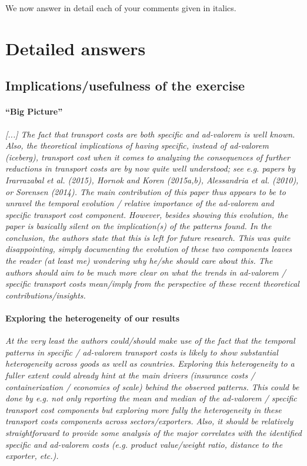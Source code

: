 \documentclass[a4paper,11pt]{article}
\begin{document}
We now answer in detail each of your comments given in italics.

\section{Detailed answers \label{sec:detailed_answers}}

\subsection{Implications/usefulness of the exercise}

\paragraph{``Big Picture''} \textit{[...] The fact that transport costs are both specific and ad-valorem is well known. Also, the theoretical implications of having specific, instead of ad-valorem (iceberg), transport cost when it comes to analyzing the consequences of further reductions in transport costs are by now quite well understood; see e.g. papers by Irarrazabal et al. (2015), Hornok and Koren (2015a,b), Alessandria et al. (2010), or Sorensen (2014). The main contribution of this paper thus appears to be to unravel the temporal evolution / relative importance of the ad-valorem and specific transport cost component. However, besides showing this evolution, the paper is basically silent on the implication(s) of the patterns found. In the conclusion, the authors state that this is left for future research. This was quite disappointing, simply documenting the evolution of these two components leaves the reader (at least me) wondering why he/she should care about this. The authors should aim to be much more clear on what the trends in ad-valorem / specific transport costs mean/imply from the perspective of these recent theoretical contributions/insights.}
\smallskip
\paragraph{Exploring the heterogeneity of our results} \textit{At the very least the authors could/should make use of the fact that the temporal patterns in specific / ad-valorem transport costs is likely to show substantial heterogeneity across goods as well as countries. Exploring this heterogeneity to a fuller extent could already hint at the main drivers (insurance costs / containerization / economies of scale) behind the observed patterns. This could be done by e.g. not only reporting the mean and median of the ad-valorem / specific transport cost components but exploring more fully the heterogeneity in these transport costs components across sectors/exporters. Also, it should be relatively straightforward to provide some analysis of the major correlates with the identified specific and ad-valorem costs (e.g. product value/weight ratio, distance to the exporter, etc.).}
\medskip
\end{document}
